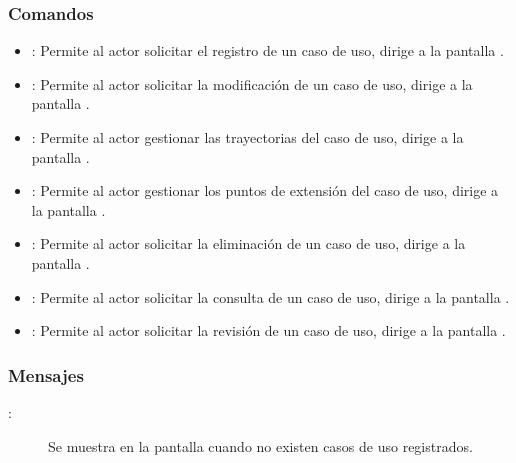 

\subsubsection{Comandos}
\begin{itemize}
	\item {}: Permite al actor solicitar el registro de un caso de uso, dirige a la pantalla .
	\item \btnEditar[Modificar]: Permite al actor solicitar la modificación de un caso de uso, dirige a la pantalla .
	\item {}: Permite al actor gestionar las trayectorias del caso de uso, dirige a la pantalla .
	\item {}: Permite al actor gestionar los puntos de extensión del caso de uso, dirige a la pantalla .
	\item \btnEliminar[Eliminar]: Permite al actor solicitar la eliminación de un caso de uso, dirige a la pantalla .
	\item \btnConsulta[Consultar]: Permite al actor solicitar la consulta de un caso de uso, dirige a la pantalla .
	\item \btnRevisar[Revisar]: Permite al actor solicitar la revisión de un caso de uso, dirige a la pantalla .
\end{itemize}

\subsubsection{Mensajes}

	
\begin{description}
	\item[:] Se muestra en la pantalla  cuando no existen casos de uso registrados.
\end{description}
